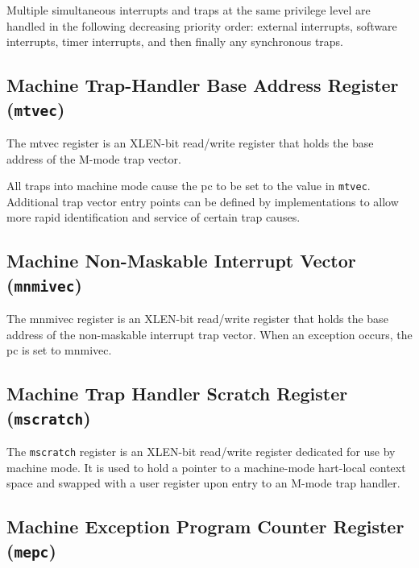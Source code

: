 Multiple simultaneous interrupts and traps at the same privilege level
are handled in the following decreasing priority order: external
interrupts, software interrupts, timer interrupts, and then finally any
synchronous traps.

\subsection{Machine Trap-Handler Base Address Register
(\texttt{mtvec})}\label{machine-trap-handler-base-address-register-mtvec}

The mtvec register is an XLEN-bit read/write register that holds the
base address of the M-mode trap vector.



All traps into machine mode cause the pc to be set to the value in
\texttt{mtvec}. Additional trap vector entry points can be defined by
implementations to allow more rapid identification and service of
certain trap causes.

\subsection{Machine Non-Maskable Interrupt Vector
(\texttt{mnmivec})}\label{machine-non-maskable-interrupt-vector-mnmivec}

The mnmivec register is an XLEN-bit read/write register that holds the
base address of the non-maskable interrupt trap vector. When an
exception occurs, the pc is set to mnmivec.



\subsection{Machine Trap Handler Scratch Register
(\texttt{mscratch})}\label{machine-trap-handler-scratch-register-mscratch}

The \texttt{mscratch} register is an XLEN-bit read/write register dedicated for
use by machine mode. It is used to hold a pointer to a machine-mode
hart-local context space and swapped with a user register upon entry to
an M-mode trap handler.



\subsection{Machine Exception Program Counter Register
(\texttt{mepc})}\label{machine-exception-program-counter-register-mepc}

